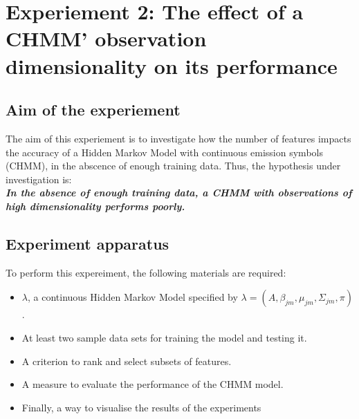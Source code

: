 \newpage
\section{Experiement 2: The effect of a CHMM' observation dimensionality on its performance} \label{exp:feat-size}

\subsection{Aim of the experiement}
The aim of this experiement is to investigate how the number of features impacts the accuracy of a Hidden Markov Model with continuous emission symbols (CHMM), in the abscence of enough training data. Thus, the hypothesis under investigation is:\\
\textbf{\textit{In the absence of enough training data, a CHMM with observations of high dimensionality performs poorly.}}

\subsection{Experiment apparatus}
To perform this expereiment, the following materials are required:
\begin{itemize}
	\item \(\lambda\), a continuous Hidden Markov Model specified by \(\lambda = (A, \beta_{jm}, \mu_{jm}, \Sigma_{jm}, \pi)\).
	\item At least two sample data sets for training the model and testing it.
	\item A criterion to rank and select subsets of features.
	\item A measure to evaluate the performance of the CHMM model.
	\item Finally, a way to visualise the results of the experiments
\end{itemize}

